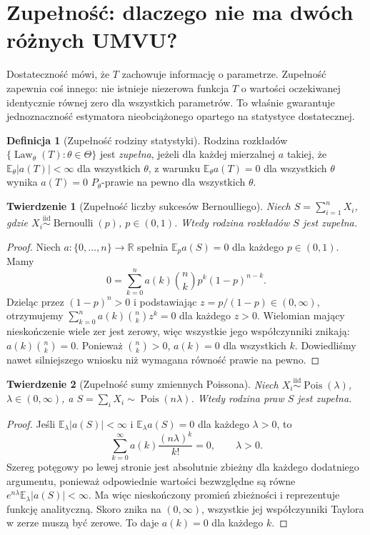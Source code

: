 \documentclass[11pt,a4paper,oneside]{report}
\numberwithin{equation}{chapter}
\theoremstyle{plain}
\newtheorem{twierdzenie}{Twierdzenie}[chapter]
\theoremstyle{definition}
\newtheorem{definicja}{Definicja}[chapter]
\theoremstyle{remark}
\newcommand{\R}{\mathbb R}
\newcommand{\E}{\mathbb E}
\newcommand{\Law}{\operatorname{Law}}
\newcommand{\iid}{\mathrel{\overset{\mathrm{iid}}\sim}}
\DeclareMathOperator{\Pois}{Pois}
\begin{document}
\section{Zupełność: dlaczego nie ma dwóch różnych UMVU?}
Dostateczność mówi, że $T$ zachowuje informację o parametrze.
Zupełność zapewnia coś innego: nie istnieje niezerowa funkcja
$T$ o wartości oczekiwanej identycznie równej zero dla wszystkich
parametrów. To właśnie gwarantuje jednoznaczność estymatora
nieobciążonego opartego na statystyce dostatecznej.

\begin{definicja}[Zupełność rodziny statystyki]\label{def:completeness}
Rodzina rozkładów $\{\Law_\theta(T):\theta\in\Theta\}$
jest \emph{zupełna}, jeżeli dla każdej mierzalnej $a$ takiej, że
$\E_\theta|a(T)|<\infty$ dla wszystkich $\theta$, z warunku
$\E_\theta a(T)=0$ dla wszystkich $\theta$ wynika
$a(T)=0$ $P_\theta$-prawie na pewno dla wszystkich $\theta$.
\end{definicja}

\begin{twierdzenie}[Zupełność liczby sukcesów Bernoulliego]
\label{thm:complete-binomial}
Niech $S=\sum_{i=1}^nX_i$, gdzie
$X_i\iid\operatorname{Bernoulli}(p)$, $p\in(0,1)$.
Wtedy rodzina rozkładów $S$ jest zupełna.
\end{twierdzenie}
\begin{proof}
Niech $a:\{0,\ldots,n\}\to\R$ spełnia
$\E_p a(S)=0$ dla każdego $p\in(0,1)$. Mamy
\[
0=\sum_{k=0}^n a(k)\binom nk p^k(1-p)^{n-k}.
\]
Dzieląc przez $(1-p)^n>0$ i podstawiając
$z=p/(1-p)\in(0,\infty)$, otrzymujemy
$\sum_{k=0}^n a(k)\binom nk z^k=0$ dla każdego $z>0$.
Wielomian mający nieskończenie wiele zer jest zerowy,
więc wszystkie jego współczynniki znikają:
$a(k)\binom nk=0$. Ponieważ $\binom nk>0$,
$a(k)=0$ dla wszystkich $k$. Dowiedliśmy nawet silniejszego
wniosku niż wymagana równość prawie na pewno.
\end{proof}

\begin{twierdzenie}[Zupełność sumy zmiennych Poissona]
\label{thm:complete-poisson}
Niech $X_i\iid\Pois(\lambda)$, $\lambda\in(0,\infty)$,
a $S=\sum_iX_i\sim\Pois(n\lambda)$. Wtedy rodzina praw
$S$ jest zupełna.
\end{twierdzenie}
\begin{proof}
Jeśli $\E_\lambda|a(S)|<\infty$ i
$\E_\lambda a(S)=0$ dla każdego $\lambda>0$, to
\[
\sum_{k=0}^\infty a(k)\frac{(n\lambda)^k}{k!}=0,
\qquad\lambda>0.
\]
Szereg potęgowy po lewej stronie jest absolutnie zbieżny
dla każdego dodatniego argumentu, ponieważ odpowiednie
wartości bezwzględne są równe
$e^{n\lambda}\E_\lambda|a(S)|<\infty$.
Ma więc nieskończony promień zbieżności i reprezentuje
funkcję analityczną. Skoro znika na $(0,\infty)$,
wszystkie jej współczynniki Taylora w zerze muszą być zerowe.
To daje $a(k)=0$ dla każdego $k$.
\end{proof}
\end{document}
